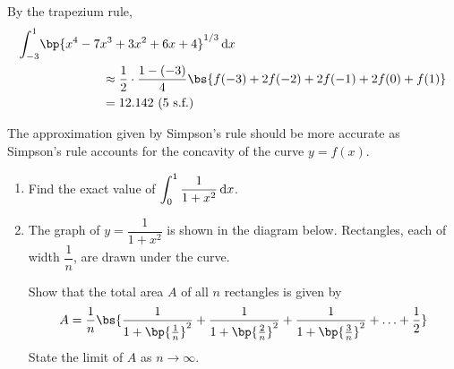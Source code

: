 \documentclass{echw}
\begin{document}

        By the trapezium rule,
        \begin{align*}
            \int_{-3}^1 &\bp{x^4 - 7x^3 + 3x^2 + 6x + 4}^{1/3} \d x\\
            &\hspace{5em}\approx \dfrac12 \cdot \dfrac{1-(-3)}{4} \bs{f(-3) + 2f(-2) + 2f(-1) + 2f(0) + f(1)}\\
            &\hspace{5em}= 12.142 \tosf{5}
        \end{align*}


        The approximation given by Simpson's rule should be more accurate as Simpson's rule accounts for the concavity of the curve $y = f(x)$.


    \problem{}
        \begin{enumerate}
            \item Find the exact value of $\displaystyle\int_0^1 \dfrac1{1 + x^2} \mathop{\mathrm{d}x}$.
            \item The graph of $y = \dfrac1{1 + x^2}$ is shown in the diagram below. Rectangles, each of width $\dfrac1n$, are drawn under the curve.
            
            Show that the total area $A$ of all $n$ rectangles is given by \[A = \dfrac1n \bs{\dfrac1{1 + \bp{\frac1n}^2} + \dfrac1{1 + \bp{\frac2n}^2} + \dfrac1{1 + \bp{\frac3n}^2} + \ldots + \dfrac12}\] State the limit of $A$ as $n \to \infty$.
        \end{enumerate}
\end{document}
